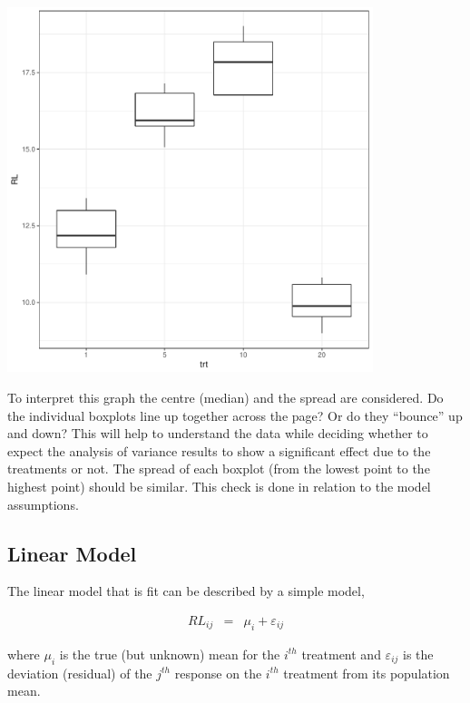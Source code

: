 \documentclass[a4paper, 10pt, fleqn, twosided]{memoir}
\begin{document}
\begin{tcolorbox}[title = Example 1 Boxplots of root length of plants for the concentrations of calcium ]
\includegraphics[width=0.8\textwidth, frame]{example1_boxplot.pdf}
\end{tcolorbox}


To interpret this graph the centre (median) and the spread are considered. Do the individual boxplots line up together
across the page? Or do they ``bounce'' up and down? This will help to understand the data while deciding whether to
expect the analysis of variance results to show a significant effect due to the treatments or not. The spread of each
boxplot (from the lowest point to the highest point) should be similar. This check is done in relation to the model
assumptions.

\subsection{Linear Model}

The linear model that is fit can be described by a simple model,

\begin{eqnarray*}
  RL_{ij} &=& \mu_i + \varepsilon_{ij}
\end{eqnarray*}

where $\mu_i$ is the true (but unknown) mean for the $i^{th}$ treatment and $\varepsilon_{ij}$ is the deviation
(residual) of the $j^{th}$ response on the $i^{th}$ treatment from its population mean.
\end{document}

